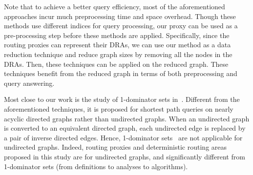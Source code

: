 Note that to achieve a better query efficiency, most of the aforementioned approaches incur much preprocessing time and space overhead. Though these methods use different indices for query processing, our proxy can be used as a pre-processing step before these methods are applied. Specifically, since the routing proxies can represent their DRAs, we can use our method as a data reduction technique and reduce graph sizes by removing all the nodes in the DRAs. Then, these techniques can be applied on the reduced graph. These techniques benefit from the reduced graph in terms of both preprocessing and query answering.


 Most close to our work is the study of 1-dominator sets in~\cite{SaundersT07}. Different from the aforementioned techniques, it is proposed for shortest path queries on nearly acyclic directed graphs rather than undirected graphs. When an undirected graph is converted to an equivalent directed graph, each undirected edge is replaced by a pair of inverse directed edges. Hence, 1-dominator sets~\cite{SaundersT07} are not applicable for undirected graphs. Indeed, routing proxies and deterministic routing areas proposed in this study  are for undirected graphs,  and  significantly different from 1-dominator sets (from definitions to analyses to algorithms).









